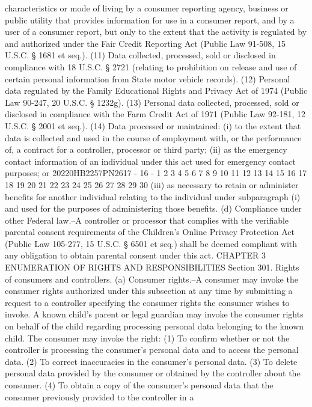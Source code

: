 characteristics or mode of living by a consumer reporting
agency, business or public utility that provides information
for use in a consumer report, and by a user of a consumer
report, but only to the extent that the activity is regulated
by and authorized under the Fair Credit Reporting Act (Public
Law 91-508, 15 U.S.C. § 1681 et seq.).
(11) Data collected, processed, sold or disclosed in
compliance with 18 U.S.C. § 2721 (relating to prohibition on
release and use of certain personal information from State
motor vehicle records).
(12) Personal data regulated by the Family Educational
Rights and Privacy Act of 1974 (Public Law 90-247, 20 U.S.C.
§ 1232g).
(13) Personal data collected, processed, sold or
disclosed in compliance with the Farm Credit Act of 1971
(Public Law 92-181, 12 U.S.C. § 2001 et seq.).
(14) Data processed or maintained:
(i) to the extent that data is collected and used in
the course of employment with, or the performance of, a
contract for a controller, processor or third party;
(ii) as the emergency contact information of an
individual under this act used for emergency contact
purposes; or
20220HB2257PN2617 - 16 -
1
2
3
4
5
6
7
8
9
10
11
12
13
14
15
16
17
18
19
20
21
22
23
24
25
26
27
28
29
30
(iii) as necessary to retain or administer benefits
for another individual relating to the individual under
subparagraph (i) and used for the purposes of
administering those benefits.
(d) Compliance under other Federal law.--A controller or
processor that complies with the verifiable parental consent
requirements of the Children's Online Privacy Protection Act
(Public Law 105-277, 15 U.S.C. § 6501 et seq.) shall be deemed
compliant with any obligation to obtain parental consent under
this act.
CHAPTER 3
ENUMERATION OF RIGHTS AND RESPONSIBILITIES
Section 301. Rights of consumers and controllers.
(a) Consumer rights.--A consumer may invoke the consumer
rights authorized under this subsection at any time by
submitting a request to a controller specifying the consumer
rights the consumer wishes to invoke. A known child's parent or
legal guardian may invoke the consumer rights on behalf of the
child regarding processing personal data belonging to the known
child. The consumer may invoke the right:
(1) To confirm whether or not the controller is
processing the consumer's personal data and to access the
personal data.
(2) To correct inaccuracies in the consumer's personal
data.
(3) To delete personal data provided by the consumer or
obtained by the controller about the consumer.
(4) To obtain a copy of the consumer's personal data
that the consumer previously provided to the controller in a
